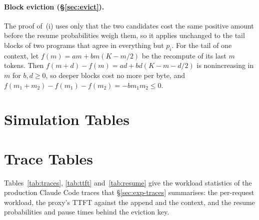 \documentclass{article}
\theoremstyle{plain}
\theoremstyle{definition}
\theoremstyle{remark}
\begin{document}
\paragraph{Block eviction (\S\ref{sec:evict}).} The proof of~(i) uses
only that the two candidates cost the same positive amount before the
resume probabilities weigh them, so it applies unchanged to the tail
blocks of two programs that agree in everything but $p_i$. For the tail
of one context, let $f(m)=am+bm(K-m/2)$ be the recompute of its last $m$
tokens. Then $f(m+d)-f(m)=ad+bd(K-m-d/2)$ is nonincreasing in $m$ for
$b,d\ge0$, so deeper blocks cost no more per byte, and
$f(m_1+m_2)-f(m_1)-f(m_2)=-bm_1m_2\le0$.

\section{Simulation Tables}\label{app:sim}


\section{Trace Tables}\label{app:traces}

Tables~\ref{tab:traces}, \ref{tab:ttft} and~\ref{tab:resume} give the
workload statistics of the production Claude Code traces that
\S\ref{sec:exp-traces} summarises: the per-request workload, the
proxy's TTFT against the append and the context, and the resume
probabilities and pause times behind the eviction key.

\begin{table}[t]
\caption{Production Claude Code traces \citep{cc-traces-weka}: main-agent
requests from the second turn on. Think time is the gap before a
request (tool plus user).}
\label{tab:traces}
\centering\footnotesize

\end{table}

\begin{table}[t]
\caption{Production Claude Code traces \citep{cc-traces-weka}: TTFT at
the proxy by appended tokens, main-agent requests from the second turn
on. The serving stack and load behind the proxy are unknown.}
\label{tab:ttft}
\centering\footnotesize

\end{table}
\end{document}
